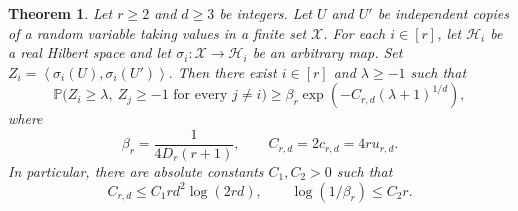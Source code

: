 \documentclass[twoside,12pt]{article}
\newtheorem{theorem}{Theorem}[section]
\theoremstyle{definition}
\theoremstyle{remark}
\newcommand{\Pp}{\mathbb P}
\newcommand{\1}{\mathbf 1}
\newcommand{\ip}[2]{\left\langle #1,#2\right\rangle}
\begin{document}
\begin{theorem}\label{thm:correlation}
Let $r\ge2$ and $d\ge3$ be integers. Let $U$ and $U'$ be independent
copies of a random variable taking values in a finite set $\mathcal X$.
For each $i\in[r]$, let $\mathcal H_i$ be a real Hilbert space and let
$\sigma_i:\mathcal X\to\mathcal H_i$ be an arbitrary map. Set
$
 Z_i=\ip{\sigma_i(U)}{\sigma_i(U')}.
$
Then there exist $i\in[r]$ and $\lambda\ge-1$ such that
\begin{equation}\label{eq:correlation-tail}
 \Pp\bigl(
  Z_i\ge\lambda,\
  Z_j\ge-1\text{ for every }j\ne i
 \bigr)
 \ge
 \beta_r\exp\!\left(-C_{r,d}(\lambda+1)^{1/d}\right),
\end{equation}
where
\begin{equation}\label{eq:correlation-constants}
 \beta_r=\frac1{4D_r(r+1)},
 \qquad
 C_{r,d}=2c_{r,d}=4ru_{r,d}.
\end{equation}
In particular, there are absolute constants $C_1,C_2>0$ such that
\begin{equation}\label{eq:correlation-constant-bounds}
 C_{r,d}\le C_1rd^2\log(2rd),
 \qquad
 \log(1/\beta_r)\le C_2r.
\end{equation}
\end{theorem}
\end{document}
